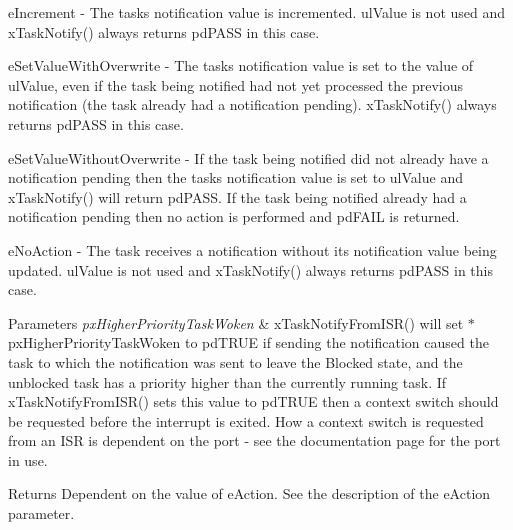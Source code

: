 e\+Increment -\/ The task\textquotesingle{}s notification value is incremented. ul\+Value is not used and x\+Task\+Notify() always returns pd\+P\+A\+S\+S in this case.

e\+Set\+Value\+With\+Overwrite -\/ The task\textquotesingle{}s notification value is set to the value of ul\+Value, even if the task being notified had not yet processed the previous notification (the task already had a notification pending). x\+Task\+Notify() always returns pd\+P\+A\+S\+S in this case.

e\+Set\+Value\+Without\+Overwrite -\/ If the task being notified did not already have a notification pending then the task\textquotesingle{}s notification value is set to ul\+Value and x\+Task\+Notify() will return pd\+P\+A\+S\+S. If the task being notified already had a notification pending then no action is performed and pd\+F\+A\+I\+L is returned.

e\+No\+Action -\/ The task receives a notification without its notification value being updated. ul\+Value is not used and x\+Task\+Notify() always returns pd\+P\+A\+S\+S in this case.


\begin{DoxyParams}{Parameters}
{\em px\+Higher\+Priority\+Task\+Woken} & x\+Task\+Notify\+From\+I\+S\+R() will set $\ast$px\+Higher\+Priority\+Task\+Woken to pd\+T\+R\+U\+E if sending the notification caused the task to which the notification was sent to leave the Blocked state, and the unblocked task has a priority higher than the currently running task. If x\+Task\+Notify\+From\+I\+S\+R() sets this value to pd\+T\+R\+U\+E then a context switch should be requested before the interrupt is exited. How a context switch is requested from an I\+S\+R is dependent on the port -\/ see the documentation page for the port in use.\\
\hline
\end{DoxyParams}
\begin{DoxyReturn}{Returns}
Dependent on the value of e\+Action. See the description of the e\+Action parameter. 
\end{DoxyReturn}
